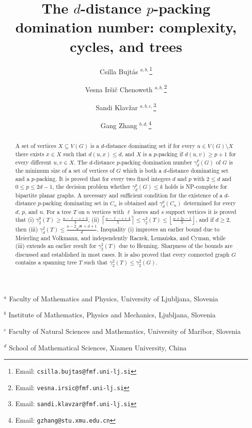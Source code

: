 \documentclass[12pt]{article}
\begin{document}
\title{The $d$-distance $p$-packing domination number: complexity, cycles, and trees}

\date{}

\author{
Csilla Bujt\'as $^{a,b,}$\thanks{Email: \texttt{csilla.bujtas@fmf.uni-lj.si}}
\and
Vesna Ir\v si\v c Chenoweth $^{a,b,}$\thanks{Email: \texttt{vesna.irsic@fmf.uni-lj.si}}
\and
Sandi Klav\v zar $^{a,b,c,}$\thanks{Email: \texttt{sandi.klavzar@fmf.uni-lj.si}}
\and
Gang Zhang $^{b,d,}$\thanks{Email: \texttt{gzhang@stu.xmu.edu.cn}}
}

\maketitle

\begin{center}
$^a$ Faculty of Mathematics and Physics, University of Ljubljana, Slovenia\\
\medskip

$^b$ Institute of Mathematics, Physics and Mechanics, Ljubljana, Slovenia\\
\medskip

$^c$ Faculty of Natural Sciences and Mathematics, University of Maribor, Slovenia\\
\medskip

$^d$ School of Mathematical Sciences, Xiamen University, China\\
\medskip
\end{center}

\begin{abstract}
A set of vertices $X\subseteq V(G)$ is a $d$-distance dominating set if for every $u\in V(G)\setminus X$ there exists $x\in X$ such that $d(u,x) \le d$, and $X$ is a $p$-packing if $d(u,v) \ge p+1$ for every different $u,v\in X$. The $d$-distance $p$-packing domination number $\gamma_d^p(G)$ of $G$ is the minimum size of a set of vertices of $G$ which is both a $d$-distance dominating set and a $p$-packing. It is proved that for every two fixed integers $d$ and $p$ with $2 \le d$ and $0 \le p \leq 2d-1$, the decision problem whether $\gamma_d^p(G) \leq k$ holds is NP-complete for bipartite planar graphs. A necessary and sufficient condition for the existence of a $d$-distance $p$-packing dominating set in $C_n$ is obtained and $\gamma_d^p(C_n)$ determined for every $d$, $p$, and $n$. For a tree $T$ on $n$ vertices with $\ell$ leaves and $s$ support vertices it is proved that (i) $\gamma_2^0(T) \geq \frac{n-\ell-s+4}{5}$, (ii) $\left \lceil \frac{n-\ell-s+4}{5} \right \rceil \leq \gamma_2^2(T) \leq \left \lfloor \frac{n+3s-1}{5} \right \rfloor$, and if $d \geq 2$, then (iii) $\gamma_d^2(T) \leq \frac{n-2\sqrt{n}+d+1}{d}$. Inequality (i) improves an earlier bound due to Meierling and Volkmann, and independently Raczek, Lema\'nska, and Cyman, while (iii) extends an earlier result for $\gamma_2^2(T)$ due to Henning. Sharpness of the bounds are discussed and established in most cases. It is also proved that every connected graph $G$ contains a spanning tree $T$ such that $\gamma_2^2(T) \leq \gamma_2^2(G)$.
\end{abstract}
\end{document}
